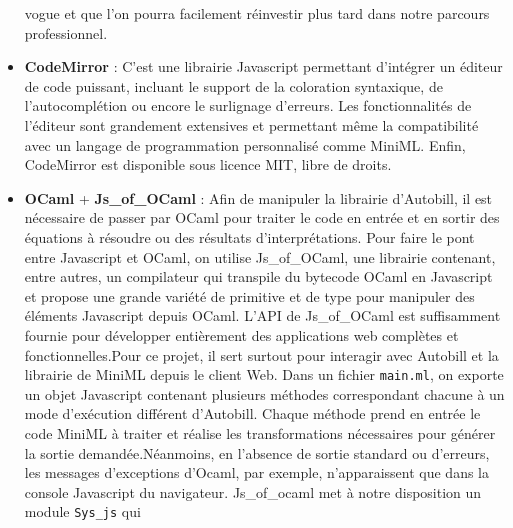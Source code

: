 \documentclass[12pt]{article}
\begin{document}
\begin{itemize}
                  vogue et que l'on pourra facilement réinvestir plus tard dans notre
                  parcours professionnel.
            \item
                  \textbf{CodeMirror} \cite{codemirror}:
                  C'est une librairie Javascript permettant d'intégrer un éditeur de
                  code puissant, incluant le support de la coloration syntaxique, de
                  l'autocomplétion ou encore le surlignage d'erreurs. Les
                  fonctionnalités de l'éditeur sont grandement extensives et permettant
                  même la compatibilité avec un langage de programmation personnalisé
                  comme MiniML. Enfin, CodeMirror est disponible sous licence MIT, libre
                  de droits.
            \item
                  \textbf{OCaml} \cite{Minsky_Ocaml}
                  \cite{chailloux}
                  \cite{Leroy} + \textbf{Js\_of\_OCaml}
                  \cite{js_of_ocaml}: Afin de manipuler la
                  librairie d'Autobill, il est nécessaire de passer par OCaml pour
                  traiter le code en entrée et en sortir des équations à résoudre ou des
                  résultats d'interprétations. Pour faire le pont entre Javascript et
                  OCaml, on utilise Js\_of\_OCaml, une librairie contenant, entre
                  autres, un compilateur qui transpile du bytecode OCaml en Javascript
                  et propose une grande variété de primitive et de type pour manipuler
                  des éléments Javascript depuis OCaml. L'API de Js\_of\_OCaml est
                  suffisamment fournie pour développer entièrement des applications web
                  complètes et fonctionnelles.\newline  Pour ce projet, il sert surtout
                  pour interagir avec Autobill et la librairie de MiniML depuis le
                  client Web. Dans un fichier \texttt{main.ml}, on exporte un objet
                  Javascript contenant plusieurs méthodes correspondant chacune à un
                  mode d'exécution différent d'Autobill. Chaque méthode prend en entrée
                  le code MiniML à traiter et réalise les transformations nécessaires
                  pour générer la sortie demandée.\newline  Néanmoins, en l'absence de
                  sortie standard ou d'erreurs, les messages d'exceptions d'Ocaml, par
                  exemple, n'apparaissent que dans la console Javascript du navigateur.
                  Js\_of\_ocaml met à notre disposition un module \texttt{Sys\_js} qui

\end{itemize}
\end{document}
